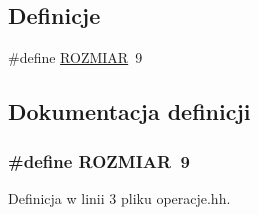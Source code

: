 \subsection*{Definicje}
\begin{DoxyCompactItemize}
\item 
\#define \hyperlink{operacje_8hh_aa50aa866c5823769bb02e986d29a0589}{R\-O\-Z\-M\-I\-A\-R}~9
\end{DoxyCompactItemize}


\subsection{Dokumentacja definicji}
\hypertarget{operacje_8hh_aa50aa866c5823769bb02e986d29a0589}{
\subsubsection[{R\-O\-Z\-M\-I\-A\-R}]{\setlength{\rightskip}{0pt plus 5cm}\#define R\-O\-Z\-M\-I\-A\-R~9}}\label{operacje_8hh_aa50aa866c5823769bb02e986d29a0589}


Definicja w linii 3 pliku operacje.\-hh.

